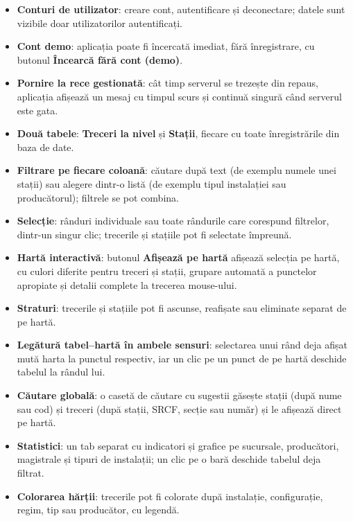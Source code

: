 \documentclass[11pt,a4paper]{article}
\newcommand{\ui}[1]{\textsf{\textbf{#1}}}
\begin{document}
\begin{itemize}
  \item \textbf{Conturi de utilizator}: creare cont, autentificare și
        deconectare; datele sunt vizibile doar utilizatorilor autentificați.
  \item \textbf{Cont demo}: aplicația poate fi încercată imediat, fără
        înregistrare, cu butonul \ui{Încearcă fără cont (demo)}.
  \item \textbf{Pornire la rece gestionată}: cât timp serverul se trezește din
        repaus, aplicația afișează un mesaj cu timpul scurs și continuă
        singură când serverul este gata.
  \item \textbf{Două tabele}: \ui{Treceri la nivel} și \ui{Stații}, fiecare cu
        toate înregistrările din baza de date.
  \item \textbf{Filtrare pe fiecare coloană}: căutare după text (de exemplu
        numele unei stații) sau alegere dintr-o listă (de exemplu tipul
        instalației sau producătorul); filtrele se pot combina.
  \item \textbf{Selecție}: rânduri individuale sau toate rândurile care
        corespund filtrelor, dintr-un singur clic; trecerile și stațiile pot
        fi selectate împreună.
  \item \textbf{Hartă interactivă}: butonul \ui{Afișează pe hartă} afișează selecția pe
        hartă, cu culori diferite pentru treceri și stații, grupare automată a
        punctelor apropiate și detalii complete la trecerea mouse-ului.
  \item \textbf{Straturi}: trecerile și stațiile pot fi ascunse, reafișate
        sau eliminate separat de pe hartă.
  \item \textbf{Legătură tabel--hartă în ambele sensuri}: selectarea unui
        rând deja afișat mută harta la punctul respectiv, iar un clic pe un
        punct de pe hartă deschide tabelul la rândul lui.
  \item \textbf{Căutare globală}: o casetă de căutare cu sugestii găsește
        stații (după nume sau cod) și treceri (după stații, SRCF, secție sau
        număr) și le afișează direct pe hartă.
  \item \textbf{Statistici}: un tab separat cu indicatori și grafice pe
        sucursale, producători, magistrale și tipuri de instalații; un clic pe
        o bară deschide tabelul deja filtrat.
  \item \textbf{Colorarea hărții}: trecerile pot fi colorate după instalație,
        configurație, regim, tip sau producător, cu legendă.

\end{itemize}
\end{document}
